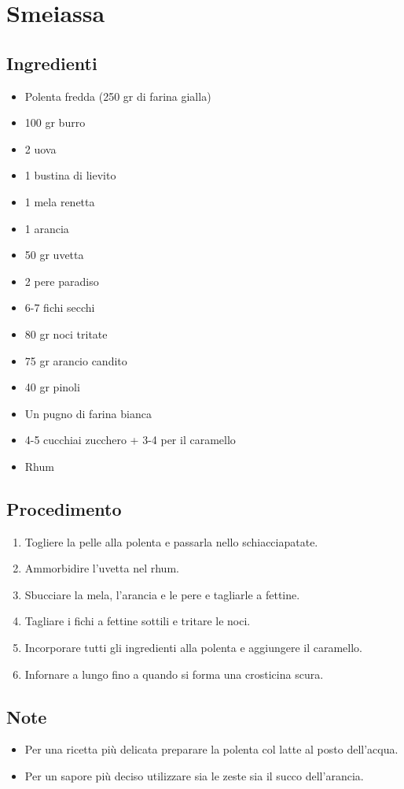 \section{Smeiassa }
\subsection{Ingredienti}
\begin{itemize}
\item Polenta fredda (250 gr di farina gialla)  
\item 100 gr burro   
\item 2 uova  
\item 1 bustina di lievito  
\item 1 mela renetta  
\item 1 arancia   
\item 50 gr uvetta   
\item 2 pere paradiso  
\item 6-7 fichi secchi  
\item 80 gr noci tritate  
\item 75 gr arancio candito  
\item 40 gr pinoli  
\item Un pugno di farina bianca  
\item 4-5 cucchiai zucchero + 3-4 per il caramello  
\item Rhum
\end{itemize}
\subsection{Procedimento}
\begin{enumerate}
\item  Togliere la pelle alla polenta e passarla nello schiacciapatate.  
\item  Ammorbidire l'uvetta nel rhum.  
\item  Sbucciare la mela, l'arancia e le pere e tagliarle a fettine.  
\item  Tagliare i fichi a fettine sottili e tritare le noci.  
\item  Incorporare tutti gli ingredienti alla polenta e aggiungere il caramello.  
\item  Infornare a lungo fino a quando si forma una crosticina scura.
\end{enumerate}
\subsection{Note}
\begin{itemize}
\item Per una ricetta più delicata preparare la polenta col latte al posto dell'acqua.  
\item Per un sapore più deciso utilizzare sia le zeste sia il succo dell'arancia.
\end{itemize}
